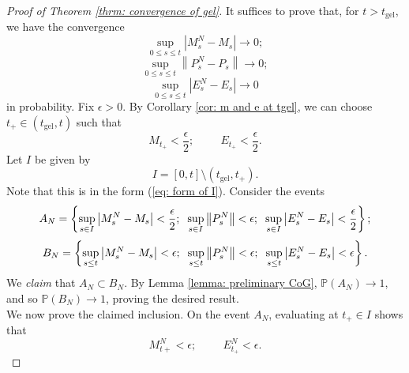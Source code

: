 \begin{proof}[Proof of Theorem \ref{thrm: convergence of gel}] It suffices to prove that, for $t>t_\text{gel}$, we have the convergence \begin{equation}
    \sup_{0\leq s \leq t}\left|M^N_s - M_s\right|\rightarrow 0;
\end{equation} \begin{equation}
    \sup_{0\leq s \leq t}\left\|P^N_s - P_s\right\|\rightarrow 0;
\end{equation} \begin{equation}
    \sup_{0\leq s \leq t}\left|E^N_s - E_s\right|\rightarrow 0
\end{equation} in probability. Fix $\epsilon>0.$ By Corollary \ref{cor: m and e at tgel}, we can choose $t_+\in(t_\text{gel},t)$ such that \begin{equation} \label{eq: choice of tplus}
    M_{t_+}<\frac{\epsilon}{2}; \hspace{1cm} E_{t_+}<\frac{\epsilon}{2}.
\end{equation} Let $I$ be given by \begin{equation}
    I=[0,t]\setminus (t_\text{gel}, t_+).
\end{equation}Note that this is in the form (\ref{eq: form of I}). Consider the events
\begin{equation}
    A_N=\left\{\sup_{s\in I} \left|M^N_s - M_s\right|<\frac{\epsilon}{2};\hspace{0.2cm} \sup_{s\in I} \left\|P^N_s\right\|<\epsilon;  \hspace{0.2cm}\sup_{s\in I} \left|E^N_s - E_s\right|<\frac{\epsilon}{2} \right\};
\end{equation}
\begin{equation}
    B_N=\left\{\sup_{s\leq t} \left|M^N_s - M_s\right|<\epsilon;\hspace{0.2cm} \sup_{s\leq t} \left\|P^N_s \right\|< \epsilon;  \hspace{0.2cm}\sup_{s\leq t} \left|E^N_s - E_s\right|< \epsilon \right\}.
\end{equation} We \emph{claim} that $A_N\subset B_N$. By Lemma \ref{lemma: preliminary CoG}, $\mathbb{P}(A_N)\rightarrow 1$, and so $\mathbb{P}(B_N)\rightarrow 1$, proving the desired result. \medskip \\ We now prove the claimed inclusion. On the event $A_N$, evaluating at $t_+\in I$ shows that \begin{equation}
    M^N_{t+}<\epsilon;\hspace{1cm} E^N_{t_+}<\epsilon.

\end{equation}
\end{proof}
